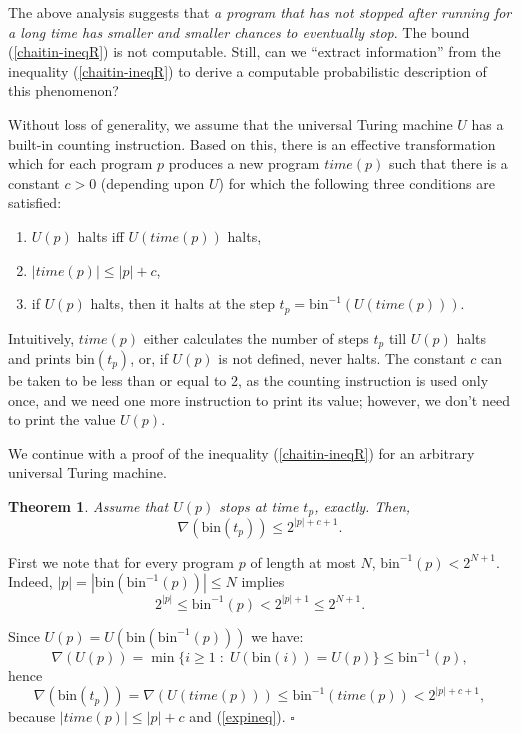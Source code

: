\documentclass[12pt,twoside,openright]{report}
\newtheorem{thm}{Theorem}
\newcommand{\QED}{\hfill $\square$}
\newcommand{\bin}{\mbox{bin}}
\newcommand{\myproof}{\noindent {\em Proof.}  }
\begin{document}
The above analysis suggests that {\it a program that has not stopped after running for a long time has smaller and smaller chances to eventually stop}. The bound (\ref{chaitin-ineqR}) is not computable.  Still, can we ``extract information'' from the inequality (\ref{chaitin-ineqR}) to derive a computable probabilistic description of this phenomenon? 


Without loss of generality, we assume that the universal Turing machine $U$ has a built-in counting instruction. Based on this, there is an effective transformation which for each program $p$ produces a new program $time(p)$ such that there is a constant $c>0$ (depending upon $U$) for which the following three conditions are satisfied:
\begin{enumerate}
\item $U(p)$ halts iff $U(time(p))$ halts,
\item $|time(p)| \le |p| + c$,
\item if $U(p)$ halts, then it halts at the step $t_{p} = \bin^{-1}(U(time(p)))$.
\end{enumerate}

Intuitively, $time(p)$ either calculates the number of steps $t_{p}$ till $U(p)$ halts and prints $\bin(t_{p})$, or, if $U(p)$ is not defined, never halts. The constant $c$ can be taken to be less than or equal to 2, as the counting instruction is used only once, and we need one more instruction to print its value; however, we  don't need to print the value $U(p)$. 

\medskip

We continue with a proof of the inequality (\ref{chaitin-ineqR}) for an arbitrary universal Turing machine.
  
\medskip

\begin{thm}
\label{nablaineq}
Assume that $U(p)$ stops at time $t_{p}$, exactly. Then,
\begin{equation}
\label{chaitin-ineqRR}\nabla (\bin (t_{p})) \le 2^{|p|+c+1}.
\end{equation}
\end{thm}
\myproof First we note that for every program $p$ of length at most $N$, $\bin^{-1}(p) < 2^{N+1}$. Indeed, $|p| =|\bin(\bin^{-1}(p))| \le N$ implies 
\begin{equation}
\label{expineq}
2^{|p|} \le \bin^{-1} (p) < 2^{|p|+1} \le  2^{N+1}.
\end{equation}

Since $U(p) = U(\bin(\bin^{-1}(p)))$ we have:
\[\nabla (U(p))  = \min\{i\ge 1\;:\; U(\bin(i))=U(p)\}\le \bin^{-1}(p),\]
\noindent hence
\[\nabla (\bin(t_{p}))  = \nabla (U(time(p)))  \le \bin^{-1}(time(p)) < 2^{|p| + c +1},\]
\noindent because $|time(p)| \le |p|+c$ and (\ref{expineq}). 
\QED
\end{document}
